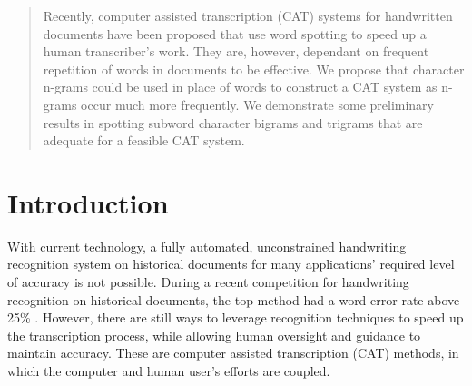 \documentclass[conference]{IEEEtran}
\begin{document}
\maketitle

\begin{abstract}
Recently, computer assisted transcription (CAT) systems for handwritten documents have been proposed that use word spotting to speed up a human transcriber's work. They are, however, dependant on frequent repetition of words in documents to be effective. We propose that character n-grams could be used in place of words to construct a CAT system as n-grams occur much more frequently. We demonstrate some preliminary results in spotting subword character bigrams and trigrams that are adequate for a feasible CAT system.
\end{abstract}





%
\IEEEpeerreviewmaketitle



\section{Introduction} %
With current technology, a fully automated, unconstrained handwriting recognition system on historical documents for many applications' required level of accuracy is not possible. During a recent competition for handwriting recognition on historical documents, the top method had a word error rate above 25\% \cite{icdarComp2015}.  %
However, there are still ways to leverage recognition techniques to speed up the transcription process, while allowing human oversight and guidance to maintain accuracy. These are computer assisted transcription (CAT) methods, in which the computer and human user's efforts are coupled.
\end{document}
